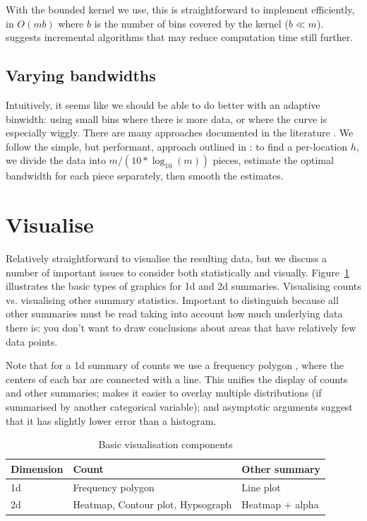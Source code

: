 \documentclass[journal]{vgtc}                %
\begin{document}
With the bounded kernel we use, this is straightforward to implement efficiently, in $O(m b)$ where $b$ is the number of bins covered by the kernel ($b \ll m$). \citep{fan:1994} suggests incremental algorithms that may reduce computation time still further.

\subsection{Varying bandwidths}

Intuitively, it seems like we should be able to do better with an adaptive binwidth: using small bins where there is more data, or where the curve is especially wiggly. There are many approaches documented in the literature  \citep{terrell:1992, brockmann:1993,schucany:1995,herrmann:1997}. We follow the simple, but performant, approach outlined in \citep{fan:1995}: to find a per-location $h$, we divide the data into $m / (10 * \log_{10}(m))$ pieces, estimate the optimal bandwidth for each piece separately, then smooth the estimates.


\section{Visualise}
\label{sec:visualise}

Relatively straightforward to visualise the resulting data, but we discuss a number of important issues to consider both statistically and visually.  Figure~\ref{fig:vis-types} illustrates the basic types of graphics for 1d and 2d summaries. Visualising counts vs. visualising other summary statistics.  Important to distinguish because all other summaries must be read taking into account how much underlying data there is: you don't want to draw conclusions about areas that have relatively few data points.

Note that for a 1d summary of counts we use a frequency polygon \citep{scott:1985a}, where the centers of each bar are connected with a line. This unifies the display of counts and other summaries; makes it easier to overlay multiple distributions (if summarised by another categorical variable); and asymptotic arguments suggest that it has slightly lower error than a histogram.

\begin{table}
  \scriptsize
  \centering
  \begin{tabular}{lll}
  \toprule
  Dimension & Count & Other summary\\
  \midrule
  1d & Frequency polygon & Line plot \\
  2d & Heatmap, Contour plot, Hypsograph & Heatmap + alpha\\
  \bottomrule
  \end{tabular}
  \caption{Basic visualisation components}
  \label{fig:vis-types}
\end{table}
\end{document}
